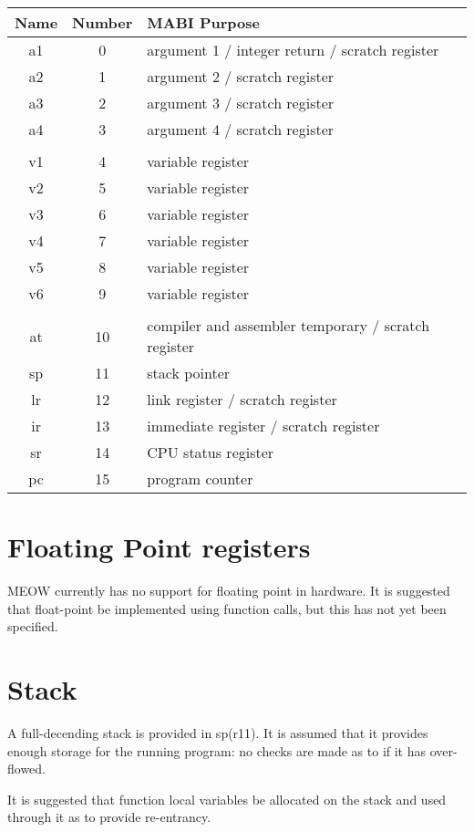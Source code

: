 \documentclass[a4paper,twoside,openany]{book}
\begin{document}
      \begin{tabular}{c c l}
        Name & Number & MABI Purpose\\
        \hline
        a1 & 0 & argument 1 / integer return / scratch register\\
        a2 & 1 & argument 2 / scratch register\\
        a3 & 2 & argument 3 / scratch register\\
        a4 & 3 & argument 4 / scratch register\\
        \\
        v1 & 4 & variable register\\
        v2 & 5 & variable register\\
        v3 & 6 & variable register\\
        v4 & 7 & variable register\\
        v5 & 8 & variable register\\
        v6 & 9 & variable register\\
        \\
        at & 10 & compiler and assembler temporary / scratch register\\
        sp & 11 & stack pointer\\
        lr & 12 & link register / scratch register\\
        ir & 13 & immediate register / scratch register\\
        sr & 14 & CPU status register\\
        pc & 15 & program counter
      \end{tabular}
          
    \section{Floating Point registers}
      MEOW currently has no support for floating point in hardware.  It is
      suggested that float-point be implemented using function calls, but
      this has not yet been specified.
    
    \section{Stack}
      A full-decending stack is provided in sp(r11).  It is assumed that it
      provides enough storage for the running program: no checks are made
      as to if it has over-flowed.

      It is suggested that function local variables be allocated on the stack
      and used through it as to provide re-entrancy.
    
\end{document}
